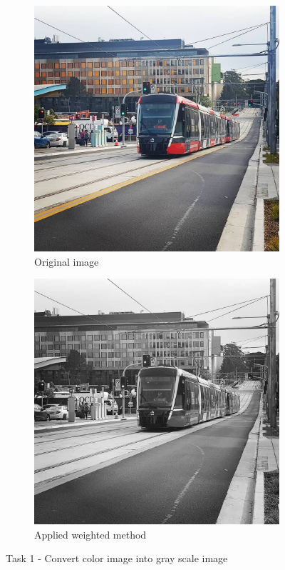 \documentclass{article}
\begin{document}
\begin{figure}[h!]
  \centering
  \begin{subfigure}[b]{0.4\linewidth}
    \includegraphics[width=\linewidth]{light_rail.jpg}
    \caption{Original image}
  \end{subfigure}
  \begin{subfigure}[b]{0.4\linewidth}
    \includegraphics[width=\linewidth]{task1_light_rail_.jpg}
    \caption{Applied weighted method}
  \end{subfigure}
  \caption{Task 1 - Convert color image into gray scale image}
  \label{fig:task1}
\end{figure}
\end{document}

